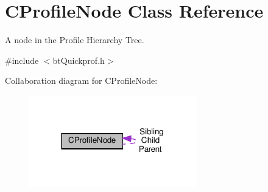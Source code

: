 \hypertarget{classCProfileNode}{}\section{C\+Profile\+Node Class Reference}
\label{classCProfileNode}


A node in the Profile Hierarchy Tree.  




{\ttfamily \#include $<$bt\+Quickprof.\+h$>$}



Collaboration diagram for C\+Profile\+Node\+:
\nopagebreak
\begin{figure}[H]
\begin{center}
\leavevmode
\includegraphics[width=206pt]{classCProfileNode__coll__graph}
\end{center}
\end{figure}
